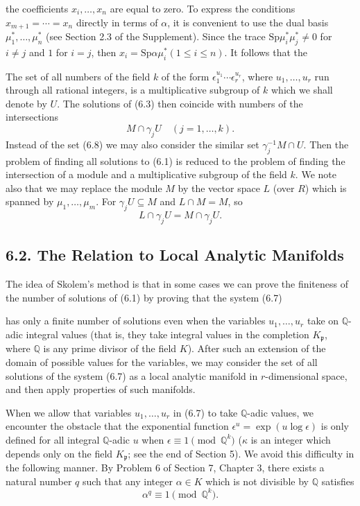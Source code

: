 \documentclass{article}
\begin{document}
the coefficients $x_i, \ldots, x_n$ are equal to zero. To express the conditions 
$x_{m+1} = \cdots = x_n$ directly in terms of $\alpha$, it is convenient to use 
the dual basis $\mu_1^*, \ldots, \mu_n^*$ (see Section 2.3 of the Supplement). 
Since the trace $\text{Sp} \mu_i^* \mu_j^* \neq 0$ for $i \neq j$ and $1$ for $i = j$, 
then $x_i = \text{Sp} \alpha \mu_i^* (1 \leq i \leq n)$. It follows that the 

The set of all numbers of the field $k$ of the form $\epsilon_1^{u_1} \cdots \epsilon_r^{u_r}$, 
where $u_1, \ldots, u_r$ run through all rational integers, is a multiplicative subgroup of $k$ 
which we shall denote by $U$. The solutions of (6.3) then coincide with numbers of the intersections 
\begin{equation}
M \cap \gamma_j U \quad (j = 1, \ldots, k).
\end{equation}
Instead of the set (6.8) we may also consider the similar set $\gamma_j^{-1} M \cap U$. 
Then the problem of finding all solutions to (6.1) is reduced to the problem of finding 
the intersection of a module and a multiplicative subgroup of the field $k$. We note also 
that we may replace the module $M$ by the vector space $L$ (over $R$) which is spanned by 
$\mu_1, \ldots, \mu_m$. For $\gamma_j U \subseteq M$ and $L \cap M = M$, so 
\begin{equation}
L \cap \gamma_j U = M \cap \gamma_j U.
\end{equation}

\subsection*{6.2. The Relation to Local Analytic Manifolds}
The idea of Skolem's method is that in some cases we can prove the finiteness of the number 
of solutions of (6.1) by proving that the system (6.7)




has only a finite number of solutions even when the variables $u_1, \ldots, u_r$ take 
on $\mathbb{Q}$-adic integral values (that is, they take integral values in the completion 
$K_{\mathfrak{p}}$, where $\mathbb{Q}$ is any prime divisor of the field $K$). After such an 
extension of the domain of possible values for the variables, we may consider the set of all 
solutions of the system (6.7) as a local analytic manifold in $r$-dimensional space, and then 
apply properties of such manifolds.

When we allow that variables $u_1, \ldots, u_r$ in (6.7) to take $\mathbb{Q}$-adic values, 
we encounter the obstacle that the exponential function $\epsilon^u = \exp(u \log \epsilon)$ 
is only defined for all integral $\mathbb{Q}$-adic $u$ when $\epsilon \equiv 1 \pmod{\mathbb{Q}^k}$ 
($\kappa$ is an integer which depends only on the field $K_{\mathfrak{p}}$; see the end of Section 5). 
We avoid this difficulty in the following manner. By Problem 6 of Section 7, Chapter 3, 
there exists a natural number $q$ such that any integer $\alpha \in K$ which is not divisible 
by $\mathbb{Q}$ satisfies
\begin{equation}
\alpha^q \equiv 1 \pmod{\mathbb{Q}^k}.
\end{equation}
\end{document}
